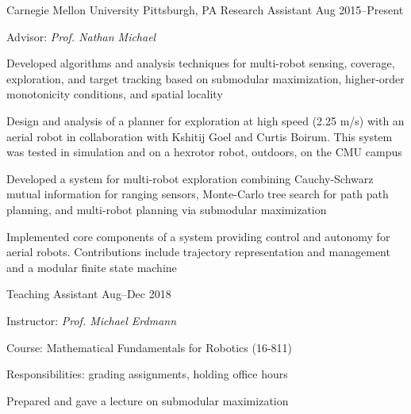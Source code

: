 
\begin{cventries}
  \cventrytwo
  {Carnegie Mellon University}
  {Pittsburgh, PA}
  {Research Assistant}
  {Aug 2015--Present}
  {
    \begin{cvitems} %
    \item Advisor: \emph{Prof. Nathan Michael}
    \item Developed algorithms and analysis techniques for multi-robot sensing,
      coverage, exploration, and target tracking based on submodular
      maximization, higher-order monotonicity conditions, and spatial locality
    \item Design and analysis of a planner for exploration at high speed (2.25
      m/s) with an aerial robot in collaboration with Kshitij Goel and Curtis
      Boirum.
      This system was tested in simulation and on a hexrotor robot, outdoors, on
      the CMU campus
    \item Developed a system for multi-robot exploration combining Cauchy-Schwarz
      mutual information for ranging sensors, Monte-Carlo tree search for path
      path planning, and multi-robot planning via submodular maximization
    \item Implemented core components of a system providing control and autonomy
      for aerial robots.
      Contributions include trajectory representation and management and a
      modular finite state machine
    \end{cvitems}
  }
  {Teaching Assistant}
  {Aug--Dec 2018}
  {
    \begin{cvitems} %
    \item Instructor: \emph{Prof. Michael Erdmann}
    \item Course: Mathematical Fundamentals for Robotics (16-811)
    \item Responsibilities: grading assignments, holding office hours
    \item Prepared and gave a lecture on submodular maximization
    \end{cvitems}
  }


\end{cventries}
